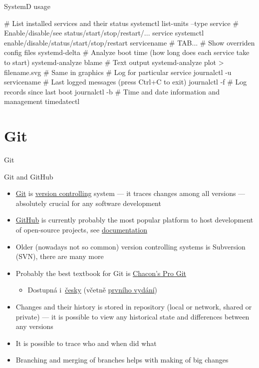 \documentclass[compress, ucs, xelatex, 11pt, xcolor=svgnames,
  hyperref={
    bookmarks=true,
    unicode=true,
    colorlinks=true,
    pdftitle={Linux, command line and MetaCentrum},
    plainpages=false,
    pdfauthor={Vojtech Zeisek},
    pdfsubject={Course about use of Linux command line, writing shell scripts and using MetaCentrum of CESNET},
    pdfcreator={XeLaTeX},
    pdfkeywords={Linux, GNU, BASH, shell, command line, MetaCentrum},
    linkcolor=DarkRed,
    anchorcolor=DarkBlue,
    citecolor=Indigo,
    filecolor=NavyBlue,
    menucolor=DarkMagenta,
    urlcolor=DarkBlue,
    pdftex},
  url={hyphens, lowtilde} %
  ]{beamer}
\begin{document}
\begin{frame}[fragile]{SystemD usage}
  \begin{bashcode}
    # List installed services and their status
    systemctl list-units --type service
    # Enable/disable/see status/start/stop/restart/... service
    systemctl enable/disable/status/start/stop/restart servicename # TAB...
    # Show overriden config files
    systemd-delta
    # Analyze boot time (how long does each service take to start)
    systemd-analyze blame # Text output
    systemd-analyze plot > filename.svg # Same in graphics
    # Log for particular service
    journalctl -u servicename
    # Last logged messages (press Ctrl+C to exit)
    journalctl -f
    # Log records since last boot
    journalctl -b
    # Time and date information and management
    timedatectl
  \end{bashcode}
\end{frame}


\section{Git}


\begin{frame}{Git}
  \tableofcontents[currentsection, sectionstyle=show/hide, hideothersubsections]
\end{frame}

\begin{frame}[fragile]{Git and GitHub}
  \begin{itemize}
    \item \href{https://git-scm.com/}{Git} is \href{https://en.wikipedia.org/wiki/Version_control}{version controlling} system --- it traces changes among all versions --- absolutely crucial for any software development
    \item \href{https://github.com/}{GitHub} is currently probably the most popular platform to host development of open-source projects, see \href{https://help.github.com/}{documentation}
    \item Older (nowadays not so common) version controlling systems is Subversion (SVN), there are many more
    \item Probably the best textbook for Git is \href{https://git-scm.com/book/en/v2}{Chacon's Pro Git}
    \begin{itemize}
      \item Dostupná i~\href{https://git-scm.com/book/cs/v2}{česky} (včetně \href{https://knihy.nic.cz/}{prvního vydání})
    \end{itemize}
    \item Changes and their history is stored in repository (local or network, shared or private) --- it is possible to view any historical state and differences between any versions
    \item It is possible to trace who and when did what
    \item Branching and merging of branches helps with making of big changes
  \end{itemize}
\end{frame}
\end{document}
